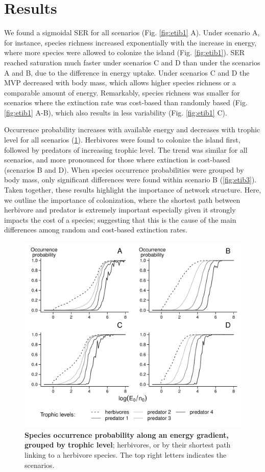 \section{Results}\label{results}

We found a sigmoidal SER for all scenarios (Fig. \ref{fig:etib1} A).
Under scenario A, for instance, species richness increased exponentially
with the increase in energy, where more species were allowed to colonize
the island (Fig. \ref{fig:etib1}). SER reached saturation much faster
under scenarios C and D than under the scenarios A and B, due to the
difference in energy uptake. Under scenarios C and D the MVP decreased
with body mass, which allows higher species richness or a comparable
amount of energy. Remarkably, species richness was smaller for scenarios
where the extinction rate was cost-based than randomly based (Fig.
\ref{fig:etib1} A-B), which also results in less variability (Fig.
\ref{fig:etib1} C).

Occurrence probability increases with available energy and decreases
with trophic level for all scenarios (\ref{fig:etib2}). Herbivores were
found to colonize the island first, followed by predators of increasing
trophic level. The trend was similar for all scenarios, and more
pronounced for those where extinction is cost-based (scenarios B and D).
When species occurrence probabilities were grouped by body mass, only
significant differences were found within scenario B (\ref{fig:etib3}).
Taken together, these results highlight the importance of network
structure. Here, we outline the importance of colonization, where the
shortest path between herbivore and predator is extremely important
especially given it strongly impacts the cost of a species; suggesting
that this is the cause of the main differences among random and
cost-based extinction rates.

\begin{figure}[htbp]
\centering
\includegraphics{chapitre4/fig/fig2.pdf}
\caption{\textbf{Species occurrence probability along an energy
gradient, grouped by trophic level}; herbivores, or by their shortest
path linking to a herbivore species. The top right letters indicates the
scenarios.\label{fig:etib2}}
\end{figure}


